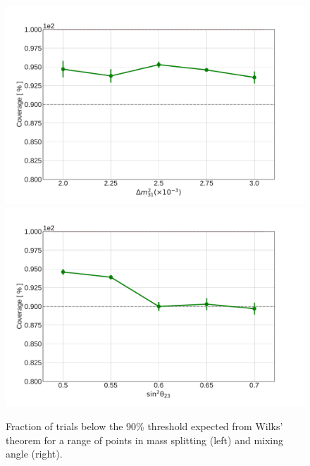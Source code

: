 \begin{figure}
    \centering
    \includegraphics[width=0.45\linewidth]{figures/measurement/three_flavor/coverage_test/coverage_dm_v3.pdf}
    \includegraphics[width=0.45\linewidth]{figures/measurement/three_flavor/coverage_test/coverage_t23_v3.pdf}
    \caption{Fraction of trials below the 90\% threshold expected from Wilks' theorem for a range of points in mass splitting (left) and mixing angle (right).}
    \label{fig:three-flavor-coverage}
\end{figure}
